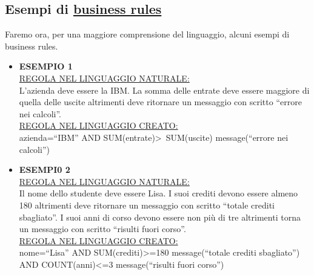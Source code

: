 \begin{center}
\section{Esempi di \underline{business rules}}
Faremo ora, per una maggiore comprensione del linguaggio, alcuni esempi di business rules.
\begin{itemize}
\item \textbf{ESEMPIO 1} \\
\underline{REGOLA NEL LINGUAGGIO NATURALE:} \\
L'azienda deve essere la IBM. La somma delle entrate deve essere maggiore di quella delle uscite altrimenti deve ritornare un messaggio con scritto ``errore nei calcoli''. \\
\underline{REGOLA NEL LINGUAGGIO CREATO:} \\
azienda=``IBM'' AND SUM(entrate)\textgreater\ SUM(uscite) message(``errore nei calcoli'')
\item \textbf{ESEMPI0 2} \\
\underline{REGOLA NEL LINGUAGGIO NATURALE:} \\
Il nome dello studente deve essere Lisa. I suoi crediti devono essere almeno 180 altrimenti deve ritornare un messaggio con scritto ``totale crediti sbagliato''. I suoi anni di corso devono essere non pi\`u di tre altrimenti torna un messaggio con scritto ``risulti fuori corso''.  \\
\underline{REGOLA NEL LINGUAGGIO CREATO:} \\
nome=``Lisa'' AND SUM(crediti)\textgreater =180 message(``totale crediti sbagliato'') AND COUNT(anni)\textless =3 message(``risulti fuori corso'')
\end{itemize}

\end{center}
